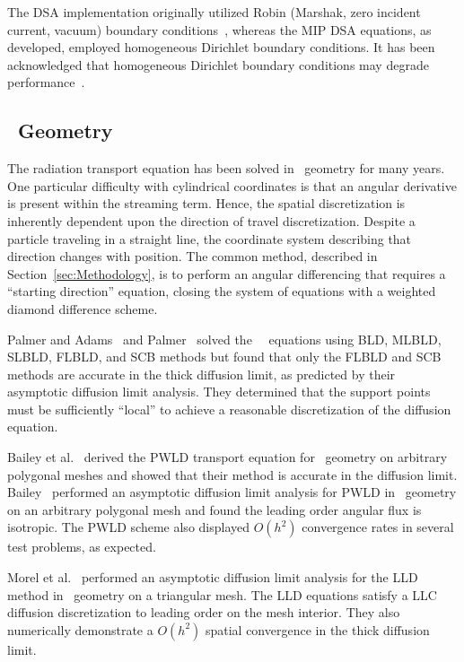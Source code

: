 \documentclass{article}
\begin{document}
The DSA implementation originally utilized Robin (Marshak, zero incident current, vacuum) boundary conditions~\cite{AdamsDSADFEM, WarsaFullyConsistentLDDSA}, whereas the MIP DSA equations, as developed, employed homogeneous Dirichlet boundary conditions. It has been acknowledged that homogeneous Dirichlet boundary conditions may degrade performance~\cite{WangDissertation}.

\subsection{\RZ\ Geometry}
The radiation transport equation has been solved in \RZ\ geometry for many years. One particular difficulty with cylindrical coordinates is that an angular derivative is present within the streaming term. Hence, the spatial discretization is inherently dependent upon the direction of travel discretization. Despite a particle traveling in a straight line, the coordinate system describing that direction changes with position. The common method, described in Section~\ref{sec:Methodology}, is to perform an angular differencing that requires a ``starting direction'' equation, closing the system of equations with a weighted diamond difference scheme.

Palmer and Adams~\cite{PalmerCurvilinearTransport} and Palmer~\cite{PalmerDissertation} solved the \RZ\ \SN\ equations using BLD, MLBLD, SLBLD, FLBLD, and SCB methods but found that only the FLBLD and SCB methods are accurate in the thick diffusion limit, as predicted by their asymptotic diffusion limit analysis. They determined that the support points must be sufficiently ``local'' to achieve a reasonable discretization of the diffusion equation.

Bailey et al.~\cite{BaileyDFEMCylindrical} derived the PWLD transport equation for \RZ\ geometry on arbitrary polygonal meshes and showed that their method is accurate in the diffusion limit. Bailey~\cite{BaileyDissertation} performed an asymptotic diffusion limit analysis for PWLD in \RZ\ geometry on an arbitrary polygonal mesh and found the leading order angular flux is isotropic. The PWLD scheme also displayed $O(h^2)$ convergence rates in several test problems, as expected.

Morel et al.~\cite{MorelLLDrz} performed an asymptotic diffusion limit analysis for the LLD method in \RZ\ geometry on a triangular mesh. The LLD equations satisfy a LLC diffusion discretization to leading order on the mesh interior. They also numerically demonstrate a $O(h^2)$ spatial convergence in the thick diffusion limit.
\end{document}
